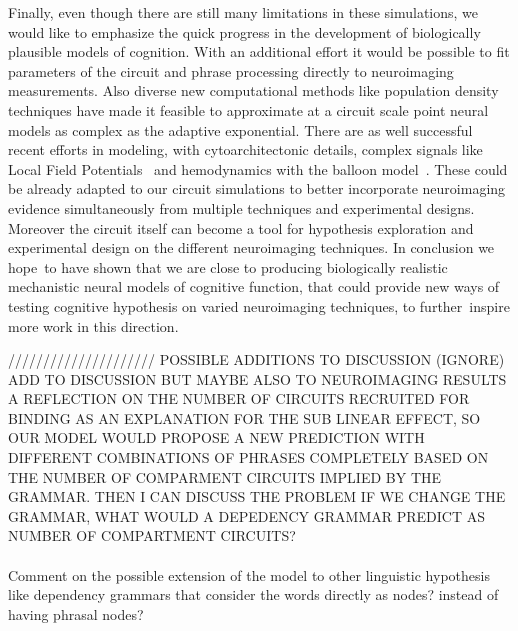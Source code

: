 \documentclass[10pt]{article}
\begin{document}
Finally, even though there are still many limitations in these simulations, we would like to emphasize the quick progress in the development of biologically plausible models of cognition.
With an additional effort it would be possible to fit parameters of the circuit and phrase processing directly to neuroimaging measurements.
Also diverse new computational methods like population density techniques have made it feasible to approximate at a circuit scale point neural models as complex as the adaptive exponential.
There are as well successful recent efforts in modeling, with cytoarchitectonic details, complex signals like Local Field Potentials~\cite{Mazzoni_2015,Hagen_2015} and hemodynamics with the balloon model~\cite{Buxton_2004}.
These could be already adapted to our circuit simulations to better incorporate neuroimaging evidence simultaneously from multiple techniques and experimental designs.
Moreover the circuit itself can become a tool for hypothesis exploration and experimental design on the different neuroimaging techniques.
In conclusion we hope~to have shown that we are close to producing biologically realistic mechanistic neural models of cognitive function, that could provide new ways of testing cognitive hypothesis on varied neuroimaging techniques, to further~inspire more work in this direction.

\newpage
///////////////////// POSSIBLE ADDITIONS TO DISCUSSION (IGNORE)
\\
ADD TO DISCUSSION BUT MAYBE ALSO TO NEUROIMAGING RESULTS A REFLECTION ON THE NUMBER OF CIRCUITS RECRUITED FOR BINDING AS AN EXPLANATION FOR THE SUB LINEAR EFFECT, SO OUR MODEL WOULD PROPOSE A NEW PREDICTION WITH DIFFERENT COMBINATIONS OF PHRASES COMPLETELY BASED ON THE NUMBER OF COMPARMENT CIRCUITS IMPLIED BY THE GRAMMAR. THEN I CAN DISCUSS THE PROBLEM IF WE CHANGE THE GRAMMAR, WHAT WOULD A DEPEDENCY GRAMMAR PREDICT AS NUMBER OF COMPARTMENT CIRCUITS?\\~\\

Comment on the possible extension of the model to other linguistic hypothesis like dependency grammars that consider the words directly as nodes? instead of having phrasal nodes?\\~\\
\end{document}
